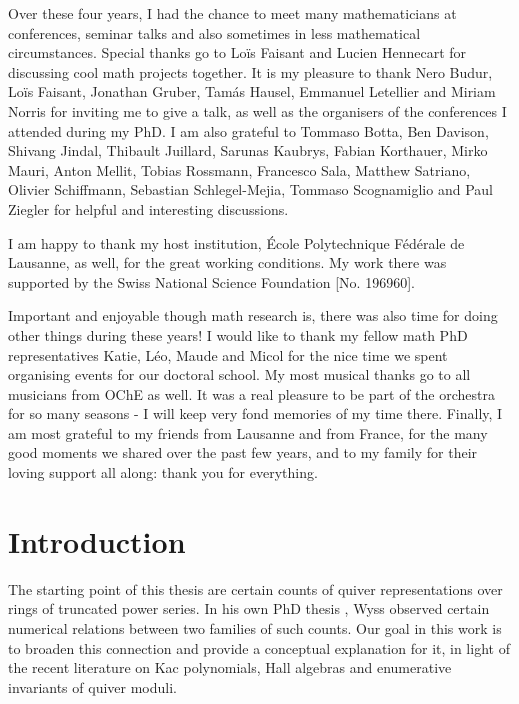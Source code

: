 \documentclass[11pt,english]{article}
\numberwithin{equation}{section}
\numberwithin{figure}{section}
\theoremstyle{definition}
\theoremstyle{plain}
\theoremstyle{remark}
\begin{document}
Over these four years, I had the chance to meet many mathematicians
at conferences, seminar talks and also sometimes in less mathematical
circumstances. Special thanks go to Loïs Faisant and Lucien Hennecart
for discussing cool math projects together. It is my pleasure to thank
Nero Budur, Loïs Faisant, Jonathan Gruber, Tam\'{a}s Hausel, Emmanuel
Letellier and Miriam Norris for inviting me to give a talk, as well
as the organisers of the conferences I attended during my PhD. I am
also grateful to Tommaso Botta, Ben Davison, Shivang Jindal, Thibault
Juillard, Sarunas Kaubrys, Fabian Korthauer, Mirko Mauri, Anton Mellit,
Tobias Rossmann, Francesco Sala, Matthew Satriano, Olivier Schiffmann,
Sebastian Schlegel-Mejia, Tommaso Scognamiglio and Paul Ziegler for
helpful and interesting discussions.

I am happy to thank my host institution, \'{E}cole Polytechnique
Fédérale de Lausanne, as well, for the great working conditions. My
work there was supported by the Swiss National Science Foundation
{[}No. 196960{]}.

Important and enjoyable though math research is, there was also time
for doing other things during these years! I would like to thank my
fellow math PhD representatives Katie, Léo, Maude and Micol for the
nice time we spent organising events for our doctoral school. My most
musical thanks go to all musicians from OChE as well. It was a real
pleasure to be part of the orchestra for so many seasons - I will
keep very fond memories of my time there. Finally, I am most grateful
to my friends from Lausanne and from France, for the many good moments
we shared over the past few years, and to my family for their loving
support all along: thank you for everything.

\pagebreak{}

\section*{Introduction \label{Intro}}


The starting point of this thesis are certain counts of quiver representations
over rings of truncated power series. In his own PhD thesis \cite{Wys17b},
Wyss observed certain numerical relations between two families of
such counts. Our goal in this work is to broaden this connection and
provide a conceptual explanation for it, in light of the recent literature
on Kac polynomials, Hall algebras and enumerative invariants of quiver
moduli.
\end{document}
